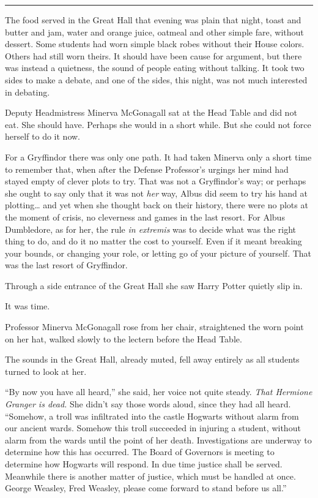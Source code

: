 \begin{center}\rule{3in}{0.4pt}\end{center}

The food served in the Great Hall that evening was plain that night,
toast and butter and jam, water and orange juice, oatmeal and other
simple fare, without dessert. Some students had worn simple black robes
without their House colors. Others had still worn theirs. It should have
been cause for argument, but there was instead a quietness, the sound of
people eating without talking. It took two sides to make a debate, and
one of the sides, this night, was not much interested in debating.

Deputy Headmistress Minerva McGonagall sat at the Head Table and did not
eat. She should have. Perhaps she would in a short while. But she could
not force herself to do it now.

For a Gryffindor there was only one path. It had taken Minerva only a
short time to remember that, when after the Defense Professor's urgings
her mind had stayed empty of clever plots to try. That was not a
Gryffindor's way; or perhaps she ought to say only that it was not
\emph{her} way, Albus did seem to try his hand at plotting\ldots{} and
yet when she thought back on their history, there were no plots at the
moment of crisis, no cleverness and games in the last resort. For Albus
Dumbledore, as for her, the rule \emph{in extremis} was to decide what
was the right thing to do, and do it no matter the cost to yourself.
Even if it meant breaking your bounds, or changing your role, or letting
go of your picture of yourself. That was the last resort of Gryffindor.

Through a side entrance of the Great Hall she saw Harry Potter quietly
slip in.

It was time.

Professor Minerva McGonagall rose from her chair, straightened the worn
point on her hat, walked slowly to the lectern before the Head Table.

The sounds in the Great Hall, already muted, fell away entirely as all
students turned to look at her.

``By now you have all heard,'' she said, her voice not quite steady.
\emph{That Hermione Granger is dead.} She didn't say those words aloud,
since they had all heard. ``Somehow, a troll was infiltrated into the
castle Hogwarts without alarm from our ancient wards. Somehow this troll
succeeded in injuring a student, without alarm from the wards until the
point of her death. Investigations are underway to determine how this
has occurred. The Board of Governors is meeting to determine how
Hogwarts will respond. In due time justice shall be served. Meanwhile
there is another matter of justice, which must be handled at once.
George Weasley, Fred Weasley, please come forward to stand before us
all.''

